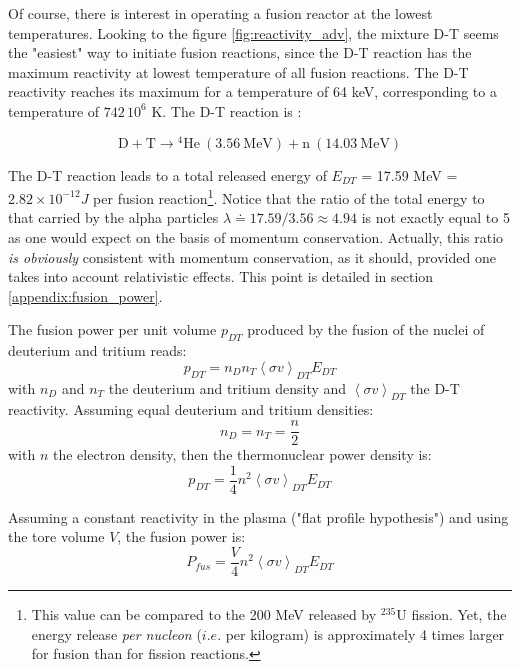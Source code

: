 Of course, there is interest in operating a fusion reactor at the lowest temperatures. Looking to the figure \ref{fig:reactivity_adv}, the mixture D-T seems the "easiest" way to initiate fusion reactions, since the D-T reaction  has the maximum reactivity at lowest temperature of all fusion reactions. The D-T reactivity reaches its maximum for a temperature of 64 keV, corresponding to a temperature of $742\,10^6$ K. The D-T reaction is : 

\begin{equation*}
    \mathrm{D + T} \longrightarrow \mathrm{{}^4 He~(3.56~MeV) + n~(14.03~MeV)}
\end{equation*}

The D-T reaction leads to a total released energy of $E_{DT}$ = 17.59 \si{MeV} = $2.82\times 10^{-12} \si{J}$ per fusion reaction\footnote{This value can be compared to the 200 MeV released by $^{235}$U fission. Yet, the energy release \emph{per nucleon} ($i.e.$ per kilogram) is approximately 4 times larger for fusion than for fission reactions.}. Notice that the ratio of the total energy to that carried by the alpha particles $\lambda \doteq 17.59/3.56 \approx 4.94$ is not exactly equal to 5 as one would expect on the basis of momentum conservation. Actually, this ratio \emph{is obviously} consistent with momentum conservation, as it should, provided one takes into account relativistic effects. This point is detailed in section \ref{appendix:fusion_power}.

The fusion power per unit volume $p_{DT}$ produced by the fusion of the nuclei of deuterium and tritium reads: 
\begin{equation*}
  p_{DT} = n_D n_T \left< \sigma v \right>_{DT} E_{DT}
\end{equation*}
with $n_D$ and $n_T$ the deuterium and tritium density and $\left< \sigma v \right>_{DT}$ the D-T reactivity. Assuming equal deuterium and tritium densities:
\begin{equation*}
  n_D = n_T = \frac{n}{2}
\end{equation*}
with $n$ the electron density, then the thermonuclear power density is:
\begin{equation*}
  p_{DT} = \frac{1}{4} n^2 \left< \sigma v \right>_{DT} E_{DT}
\end{equation*}

Assuming a constant reactivity in the plasma ("flat profile hypothesis") and using the tore volume $V$, the fusion power is: 
\begin{equation}
  P_{fus} = \frac{V}{4}
    n^2 \left< \sigma v \right>_{DT} E_{DT}
\end{equation}



